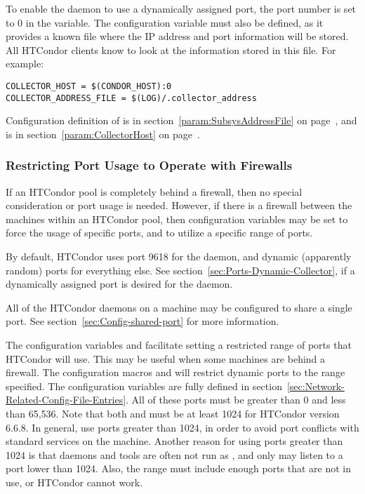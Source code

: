 To enable the  daemon to use a dynamically assigned port,
the port number is set to 0 in the 
variable.
The 
configuration variable must also be defined,
as it provides a known file where the IP address
and port information will be stored.
All HTCondor clients know to look at the
information stored in this file.
For example:
\footnotesize
\begin{verbatim}
COLLECTOR_HOST = $(CONDOR_HOST):0
COLLECTOR_ADDRESS_FILE = $(LOG)/.collector_address
\end{verbatim}
\normalsize

Configuration definition of 
is in section~\ref{param:SubsysAddressFile} on
page~\pageref{param:SubsysAddressFile},
and
is in
section~\ref{param:CollectorHost} on
page~\pageref{param:CollectorHost}.


\subsubsection{\label{sec:Ports-Firewalls}Restricting Port Usage to
 Operate with Firewalls}

If an HTCondor pool is completely behind a firewall,
then no special consideration or port usage is needed.
However, if there is a firewall between the machines within
an HTCondor pool, then
configuration variables may be set to force the usage of
specific ports, and to utilize a specific range of ports.

By default,
HTCondor uses port 9618 for the  daemon,
and dynamic (apparently random) ports for everything else.
See section~\ref{sec:Ports-Dynamic-Collector},
if a dynamically assigned port is desired for the
 daemon.

All of the HTCondor daemons on a machine
may be configured to share a single
port.  See section~\ref{sec:Config-shared-port} for more information.

The configuration variables
 and  facilitate setting a restricted
range of ports that HTCondor will use.
This may be useful when some machines are behind a firewall.
The configuration macros
 and  
will restrict dynamic ports to the range specified.
The configuration variables are fully defined
in section~\ref{sec:Network-Related-Config-File-Entries}.
All of these ports must be greater than 0 and less than 65,536.
Note that both  and  must be at 
least 1024 for HTCondor version 6.6.8.
In general, use ports greater than 1024,
in order
to avoid port conflicts with standard services on the machine.
Another reason for using ports greater than 1024 is that
daemons and tools are often not run as ,
and only  may listen to a port lower than 1024.
Also, the range must include enough ports that are not in use, 
or HTCondor cannot work.

